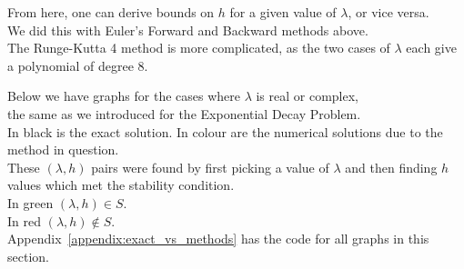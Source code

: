 \par From here, one can derive bounds on $h$ for a given value of $\lambda$, or vice versa.\\
We did this with Euler's Forward and Backward methods above.\\
The Runge-Kutta 4 method is more complicated, as the two cases of $\lambda$ each give a polynomial of degree 8.\\

\par Below we have graphs for the cases where $\lambda$ is real or complex,\\
the same as we introduced for the Exponential Decay Problem.\\
In black is the exact solution. In colour are the numerical solutions due to the method in question.\\
These $(\lambda, h)$ pairs were found by first picking a value of $\lambda$ and then finding $h$ values which met the stability condition.\\
In green $(\lambda, h) \in S$.\\
In red $(\lambda, h) \notin S$.\\
Appendix~\ref{appendix:exact_vs_methods} has the code for all graphs in this section.\\
